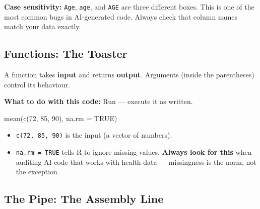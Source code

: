 \documentclass[
  letterpaper,
  DIV=11,
  numbers=noendperiod,
  oneside]{scrreprt}
\newenvironment{Shaded}{\begin{snugshade}}{\end{snugshade}}
\newcommand{\AttributeTok}[1]{\textcolor[rgb]{0.40,0.45,0.13}{#1}}
\newcommand{\ConstantTok}[1]{\textcolor[rgb]{0.56,0.35,0.01}{#1}}
\newcommand{\DecValTok}[1]{\textcolor[rgb]{0.68,0.00,0.00}{#1}}
\newcommand{\FunctionTok}[1]{\textcolor[rgb]{0.28,0.35,0.67}{#1}}
\newcommand{\NormalTok}[1]{\textcolor[rgb]{0.00,0.23,0.31}{#1}}
\providecommand{\tightlist}{%
  \setlength{\itemsep}{0pt}\setlength{\parskip}{0pt}}
\begin{document}
\begin{tcolorbox}[enhanced jigsaw, title=\textcolor{quarto-callout-warning-color}{\faExclamationTriangle}\hspace{0.5em}{Warning}, arc=.35mm, toptitle=1mm, colframe=quarto-callout-warning-color-frame, toprule=.15mm, leftrule=.75mm, bottomtitle=1mm, opacityback=0, bottomrule=.15mm, coltitle=black, breakable, opacitybacktitle=0.6, titlerule=0mm, colback=white, left=2mm, colbacktitle=quarto-callout-warning-color!10!white, rightrule=.15mm]

\textbf{Case sensitivity:} \texttt{Age}, \texttt{age}, and \texttt{AGE}
are three different boxes. This is one of the most common bugs in
AI-generated code. Always check that column names match your data
exactly.

\end{tcolorbox}

\subsection*{Functions: The Toaster}\label{functions-the-toaster}

A function takes \textbf{input} and returns \textbf{output}. Arguments
(inside the parentheses) control its behaviour.

\textbf{What to do with this code:} Run --- execute it as written.

\begin{Shaded}
\begin{Highlighting}[numbers=left,,]
\FunctionTok{mean}\NormalTok{(}\FunctionTok{c}\NormalTok{(}\DecValTok{72}\NormalTok{, }\DecValTok{85}\NormalTok{, }\DecValTok{90}\NormalTok{), }\AttributeTok{na.rm =} \ConstantTok{TRUE}\NormalTok{)}
\end{Highlighting}
\end{Shaded}

\begin{itemize}
\tightlist
\item
  \texttt{c(72,\ 85,\ 90)} is the input (a vector of numbers).
\item
  \texttt{na.rm\ =\ TRUE} tells R to ignore missing values.
  \textbf{Always look for this} when auditing AI code that works with
  health data --- missingness is the norm, not the exception.
\end{itemize}

\subsection*{The Pipe: The Assembly
Line}\label{the-pipe-the-assembly-line}
\end{document}
